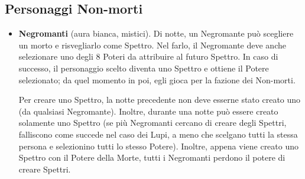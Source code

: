 \documentclass[a4paper,10pt]{article}
\begin{document}
\subsection*{Personaggi Non-morti}

\begin{itemize}
% 
% 
% 
%  
%  
% 

 \item {\bf Negromanti} (aura bianca, mistici). Di notte, un Negromante può scegliere un morto e risvegliarlo come Spettro. Nel farlo, il Negromante deve anche selezionare uno degli 8 Poteri da attribuire al futuro Spettro.
 In caso di successo, il personaggio scelto diventa uno Spettro e ottiene il Potere selezionato; da quel momento in poi, egli gioca per la fazione dei Non-morti.
 
 Per creare uno Spettro, la notte precedente non deve esserne stato creato uno (da qualsiasi Negromante). Inoltre, durante una notte può essere creato solamente uno Spettro (se più Negromanti cercano di creare degli Spettri, falliscono come succede nel caso dei Lupi, a meno che scelgano tutti la stessa persona e selezionino tutti lo stesso Potere). Inoltre, appena viene creato uno Spettro con il Potere della Morte, tutti i Negromanti perdono il potere di creare Spettri.


\end{itemize}
\end{document}

